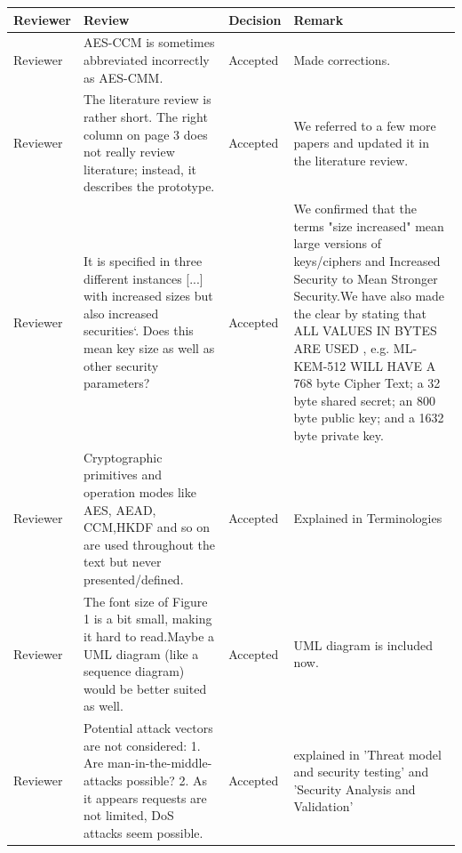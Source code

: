 \documentclass[a4paper]{scrartcl}
\begin{document}
	
	
	
	\printbibliography[title={References}]

    \begin{table}[H]
\centering
\begin{tabular}{|p{2cm}|p{5cm}|p{2cm}|p{5cm}|}
\hline
\textbf{Reviewer} & \textbf{Review} & \textbf{Decision} & \textbf{Remark} \\
\hline

Reviewer &
AES-CCM is sometimes abbreviated incorrectly as AES-CMM. &
Accepted &
Made corrections.\\
\hline

Reviewer &
The literature review is rather short. The right column on page 3 does not really review literature; instead, it describes the prototype.&
Accepted &
We referred to a few more papers and updated it in the literature review.\\
\hline

Reviewer &
It is specified in three different instances [...] with increased sizes but also increased securities‘. Does this mean key size as well as other
security parameters?&
Accepted &
We confirmed that the terms "size increased" mean large versions of keys/ciphers and Increased Security to Mean Stronger Security.We have also made the clear by stating that ALL VALUES IN BYTES ARE USED , e.g. ML-KEM-512 WILL HAVE A 768 byte Cipher Text; a 32 byte shared secret; an 800 byte public key; and a 1632 byte private key.\\
\hline

Reviewer  &
Cryptographic primitives and operation modes like AES, AEAD, CCM,HKDF and so on are used throughout the text but never
presented/defined.&
Accepted &
Explained in Terminologies\\
\hline

Reviewer &
The font size of Figure 1 is a bit small, making it hard to read.Maybe a UML diagram (like a sequence diagram) would be better suited as well. &
Accepted &
UML diagram is included now. \\
\hline

Reviewer &
Potential attack vectors are not considered: 1. Are
man-in-the-middle-attacks possible? 2. As it appears requests are not limited, DoS attacks seem possible. &
Accepted &
explained in 'Threat model and security testing' and 'Security Analysis and Validation'\\
\hline


\end{tabular}
\label{tab:review}
\end{table}
\end{document}
